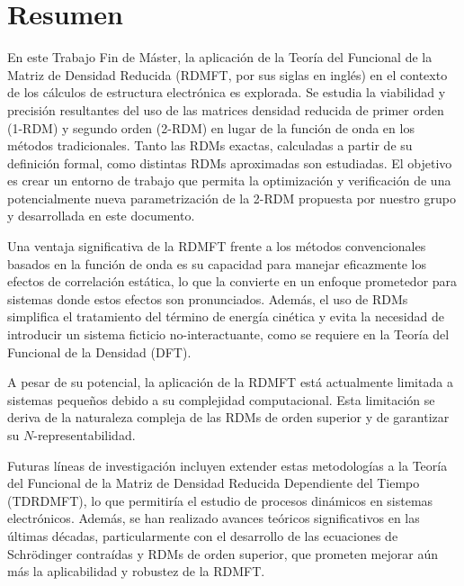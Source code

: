 \section*{Resumen}
En este Trabajo Fin de Máster, la aplicación de la Teoría del Funcional de la
Matriz de Densidad Reducida (RDMFT, por sus siglas en inglés) en el contexto de
los cálculos de estructura electrónica es explorada.
Se estudia la viabilidad y precisión resultantes del uso de las
matrices densidad reducida de primer orden (1-RDM) y segundo orden (2-RDM)
en lugar de la función de onda en los métodos tradicionales.
Tanto las RDMs exactas, calculadas a partir de su definición formal, como 
distintas RDMs aproximadas son estudiadas.
El objetivo es crear un entorno de trabajo que permita la optimización y 
verificación de una potencialmente nueva parametrización de la 2-RDM propuesta
por nuestro grupo y desarrollada en este documento.

Una ventaja significativa de la RDMFT frente a los métodos convencionales
basados en la función de onda es su capacidad para manejar eficazmente los 
efectos de correlación estática, lo que la convierte en un enfoque prometedor 
para sistemas donde estos efectos son pronunciados.
Además, el  uso de RDMs simplifica el tratamiento
del término de energía cinética y evita la necesidad de introducir un
sistema ficticio no-interactuante, como se requiere en la Teoría del Funcional de la
Densidad (DFT).

A pesar de su potencial, la aplicación de la RDMFT está actualmente limitada a 
sistemas pequeños debido a su complejidad computacional.
Esta limitación se deriva de la naturaleza compleja
de las RDMs de orden superior y de garantizar su
$N$-representabilidad.

Futuras líneas de investigación incluyen extender estas metodologías 
a la Teoría del Funcional de la Matriz de Densidad 
Reducida Dependiente del Tiempo (TDRDMFT), lo que 
permitiría el estudio de procesos dinámicos en sistemas electrónicos.
Además, se han realizado avances teóricos significativos en las últimas décadas,
particularmente con el desarrollo de las ecuaciones de Schrödinger contraídas y 
RDMs de orden superior, que prometen mejorar aún más 
la aplicabilidad y robustez de la RDMFT.

